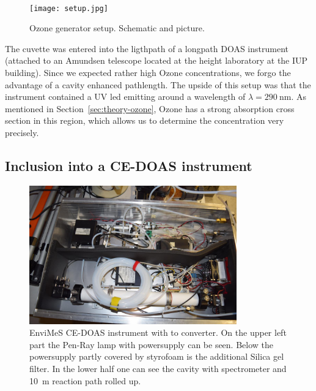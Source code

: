 \begin{figure}[htbp]
  \centering
  {
  \def\svgwidth{0.9\linewidth}
  
  }
  \phantom{h}\\
  \bigskip
  \texttt{[image: setup.jpg]}
  \caption{Ozone generator setup. Schematic and picture.}
  \label{fig:setup}
\end{figure}

The cuvette was entered into the ligthpath of a longpath DOAS
instrument (attached to an Amundsen telescope located at the height
laboratory at the IUP building). Since we expected rather high Ozone
concentrations, we forgo the advantage of a cavity enhanced
pathlength. The upside of this setup was that the instrument contained
a UV led emitting around a wavelength of $\lambda =
\SI{290}{\nano\meter}$. As mentioned in
Section~\ref{sec:theory-ozone}, Ozone has a strong absorption cross
section in this region, which allows us to determine the concentration
very precisely.

\subsection{Inclusion into a CE-DOAS instrument}
\label{sec:inclusion}

\begin{figure}[htbp]
  \centering
  \includegraphics[width=0.8\textwidth]{images/envimes_up.jpg}
  \caption{EnviMeS CE-DOAS instrument with  to 
    converter. On the upper left part the Pen-Ray lamp with
    powersupply can be seen. Below the powersupply partly covered by
    styrofoam is the additional Silica gel filter. In the lower half
    one can see the cavity with spectrometer and \SI{10}{\meter}
    reaction path rolled up.}
  \label{fig:envimes}
\end{figure}

